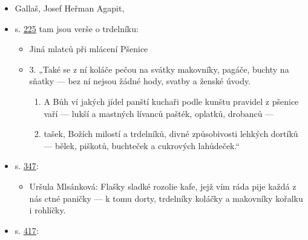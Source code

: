 \begin{itemize}
  \begin{itemize}
  \tightlist
  \item
    Gallaš, Josef Heřman Agapit,
  \item
    s.
    \href{https://ndk.cz/view/uuid:c0247bb0-d3b5-11dc-b9b7-000d606f5dc6?page=uuid:c4c850d1-41c7-4c42-8940-f42f45196b76}{225}
    tam jsou verše o trdelníku:

    \begin{itemize}
    \tightlist
    \item
      Jiná mlatců při mlácení Pšenice
    \item
      3. „Také se z ní koláče pečou na svátky makovníky, pagáče, buchty
      na sňatky --- bez ní nejsou žádné hody, svatby a ženské úvody.

      \begin{enumerate}
      \tightlist
      \item
        A Bůh ví jakých jídel panští kuchaři podle kunštu pravidel z
        pšenice vaří --- lukší a mastných lívanců pašték, oplatků,
        drobanců ---
      \item
        tašek, Božích milostí a trdelníků, divné způsobivosti lehkých
        dortíků --- bělek, piškotů, buchteček a cukrových lahůdeček.``
      \end{enumerate}
    \end{itemize}
  \item
    s.
    \href{https://ndk.cz/view/uuid:c0247bb0-d3b5-11dc-b9b7-000d606f5dc6?page=uuid:7f1464d8-a54f-4f38-9c1e-70fa4c0285e1}{347}:

    \begin{itemize}
    \tightlist
    \item
      Uršula Mlsánková: Flašky sladké rozolie kafe, jejž vím ráda pije
      každá z nás ctné paničky --- k tomu dorty, trdelníky koláčky a
      makovníky kořalku i rohlíčky.
    \end{itemize}
  \item
    s.
    \href{https://ndk.cz/view/uuid:c0247bb0-d3b5-11dc-b9b7-000d606f5dc6?page=uuid\%3Ada5b6cb7-cfb0-4ebd-b6be-84d59f5e6f72}{417}:


\end{itemize}
\end{itemize}
